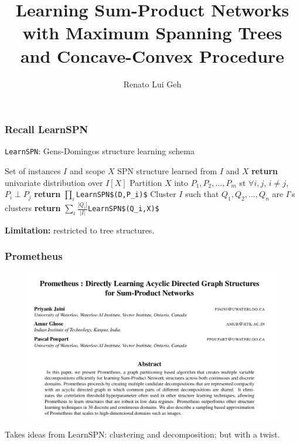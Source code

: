 \documentclass[usenames,dvipsnames]{beamer}
\title{Learning Sum-Product Networks with Maximum Spanning Trees and Concave-Convex Procedure}
\date{}
\author{Renato Lui Geh}
\institute{Institute of Mathematics and Statistics --- University of São Paulo}
\newcommand{\indep}{\perp}
\newcommand{\code}[1]{\lstinline[mathescape=true]{#1}}
\newcommand{\mcode}[1]{\lstinline[mathescape]!#1!}
\begin{document}
\maketitle

\begin{frame}
  \frametitle{Recall LearnSPN}

  \begin{algorithm}[H]
    \caption{\code{LearnSPN}: Gens-Domingos structure learning schema}
    \begin{algorithmic}[1]
      \Require Set of instances $I$ and scope $X$
      \Ensure SPN structure learned from $I$ and $X$
        \State \textbf{return} univariate distribution over $I[X]$
      \EndIf%
      \State Partition $X$ into $P_1,P_2,\ldots,P_m$ st $\forall i, j$, $i\neq j$, $P_i\indep P_j$
        \State \textbf{return} $\prod_i$\mcode{LearnSPN$(D,P_i)$}
      \EndIf%
      \State Cluster $I$ such that $Q_1,Q_2,\ldots,Q_n$ are $I$'s clusters
      \State \textbf{return} $\sum_i\frac{|Q_i|}{|I|}$\mcode{LearnSPN$(Q_i,X)$}
    \end{algorithmic}
  \end{algorithm}

  \textbf{Limitation:} restricted to tree structures.
\end{frame}

\begin{frame}
  \frametitle{Prometheus}

  \begin{figure}
    \centering\includegraphics[width=\textwidth]{imgs/prometheus.png}
  \end{figure}

  Takes ideas from LearnSPN: clustering and decomposition; but with a twist.
\end{frame}
\end{document}
